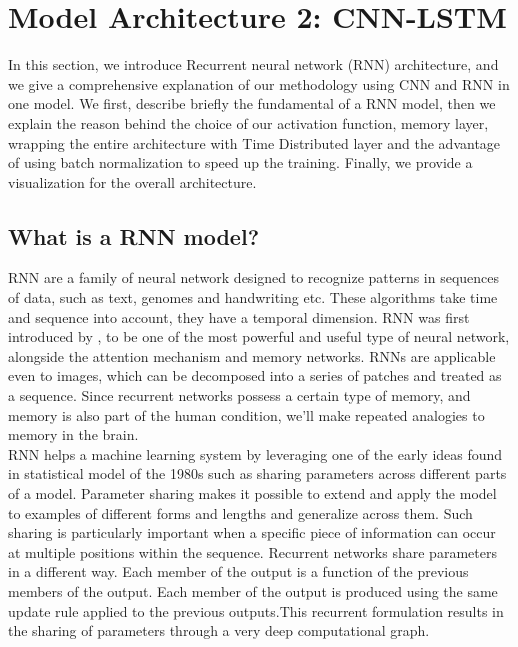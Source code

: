 

\section{Model Architecture 2: CNN-LSTM}
In this section, we introduce Recurrent neural network (RNN) architecture, and we give a comprehensive explanation of our methodology using CNN and RNN in one model. We first, describe briefly the fundamental of a RNN model, then we explain the reason behind the choice of our activation function, memory layer, wrapping the entire architecture with Time Distributed layer and the advantage of using batch normalization to speed up the training. Finally, we provide a visualization for the overall architecture.

\subsection{What is a RNN model?}

RNN are a family of neural network designed to recognize patterns in sequences of data, such as text, genomes and handwriting etc. These algorithms take time and sequence into account, they have a temporal dimension.
RNN was first introduced by \cite{rumelhart1986learning}, to be one of the most powerful and useful type of neural network, alongside the attention mechanism and memory networks. RNNs are applicable even to images, which can be decomposed into a series of patches and treated as a sequence.
Since recurrent networks possess a certain type of memory, and memory is also part of the human condition, we’ll make repeated analogies to memory in the brain.\\

RNN helps a machine learning system by leveraging one of the early ideas found in statistical model of the 1980s such as sharing parameters across different parts of a model. Parameter sharing makes it possible to extend and apply the model to examples of different forms and lengths and generalize across them. Such sharing is particularly important when a specific piece of information can occur at multiple positions within the sequence. Recurrent networks share parameters in a different way. Each member of the output is a function of the previous members of the output. Each member of the output is produced using the same update rule applied to the previous outputs.This recurrent formulation results in the sharing of parameters through a very deep computational graph.\\

